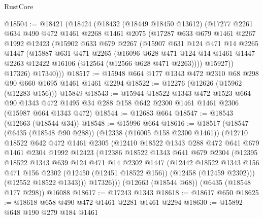 \begin{lexlean}{RustCore}
\begin{coremodule}
@18504 := @18421
    (@18424
      (@18432
        (@18449 @18450 @13612)
        (@17277
          @2261
          @634
          @490
          @472
          @1461
          @2268
          @1461
          @2075
          (@17287
            @633
            @679
            @1461
            @2267
            @1992
            @12423
            (@15902
              @633
              @679
              @2267
              (@15907
                @631
                @124
                @471
                @14
                @2265
                @1447
                (@15887
                  @631
                  @471
                  @2265
                  (@16096
                    @628
                    @471
                    @124
                    @14
                    @1461
                    @1447
                    @2263
                    @12422
                    @16106
                    (@12564 (@12566 @628 @471 @2263))))
                @15927))
            @17326)
          @17340)))
@18517 := @15948 @664 @177 @1343 @472 @2310 @68 @298 @90 @660 @1695 @1461 @1461 @2294
@18522 := @12276 (@12626 (@15962 (@12283 @156))) @15849
@18543 := @15944
    @18522
    @1343
    @472
    @1523
    @664
    @90
    @1343
    @472
    @1495
    @34
    @288
    @158
    @642
    @2300
    @1461
    @1461
    @2306
    (@15987 @664 @1343 @472)
@18544 := @12683 @664
@18547 := @18543 (@12663 (@18544 @34))
@18548 := @15996 @664
@18616 := @18517
    (@18547
      (@6435 (@18548 @90 @288))
      (@12338 (@16005 @158 @2300 @1461))
      (@12710
        @18522
        @642
        @472
        @1461
        @2305
        (@12410
          @18522
          @1343
          @288
          @472
          @641
          @679
          @1461
          @2304
          @1992
          @12423
          (@12386
            @18522
            @1343
            @641
            @679
            @2304
            (@12395
              @18522
              @1343
              @639
              @124
              @471
              @14
              @2302
              @1447
              (@12442
                @18522
                @1343
                @156
                @471
                @156
                @2302
                (@12450 (@12451 @18522 @156))
                (@12458 (@12459 @2302)))
              (@12552 @18522 @1343)))
          @17326)))
    (@12663 (@18544 @68))
    (@6435 (@18548 @177 @298))
    @16088
@18617 := @17243 @1343
@18618 := @18617 @650
@18625 := @18618 @658 @490 @472 @1461 @2281 @1461 @2294
@18630 := @15892 @648 @190 @279 @184 @1461

\end{coremodule}
\end{lexlean}
